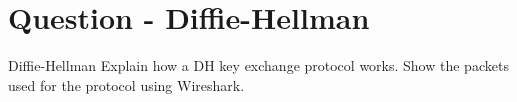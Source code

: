 \section{Question - Diffie-Hellman}

\begin{questionBox}{Diffie-Hellman}
    Explain how a DH key exchange protocol works. Show the packets used for the protocol using Wireshark.
\end{questionBox}
